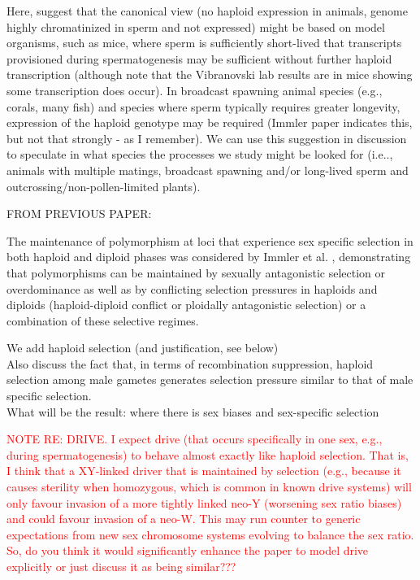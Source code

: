 \documentclass[12pt]{article}
\begin{document}
Here, suggest that the canonical view (no haploid expression in animals, genome highly chromatinized in sperm and not expressed) might be based on model organisms, such as mice, where sperm is sufficiently short-lived that transcripts provisioned during spermatogenesis may be sufficient without further haploid transcription (although note that the Vibranovski lab results are in mice showing some transcription does occur). 
In broadcast spawning animal species (e.g., corals, many fish) and species where sperm typically requires greater longevity, expression of the haploid genotype may be required (Immler paper indicates this, but not that strongly - as I remember). 
We can use this suggestion in discussion to speculate in what species the processes we study might be looked for (i.e.., animals with multiple matings, broadcast spawning and/or long-lived sperm and outcrossing/non-pollen-limited plants). 

{\color{blue} 
\noindent FROM PREVIOUS PAPER:

The maintenance of polymorphism at loci that experience sex specific selection in both haploid and diploid phases was considered by Immler et al. \cite{Immler:2012tl}, demonstrating that polymorphisms can be maintained by sexually antagonistic selection or overdominance as well as by conflicting selection pressures in haploids and diploids (haploid-diploid conflict or ploidally antagonistic selection) or a combination of these selective regimes.  

}

We add haploid selection (and justification, see below)
\\
Also discuss the fact that, in terms of recombination suppression, haploid selection among male gametes generates selection pressure similar to that of male specific selection. 
\\
What will be the result: where there is sex biases and sex-specific selection




\textcolor{red}{NOTE RE: DRIVE. I expect drive (that occurs specifically in one sex, e.g., during spermatogenesis) to behave almost exactly like haploid selection. That is, I think that a XY-linked driver that is maintained by selection (e.g., because it causes sterility when homozygous, which is common in known drive systems) will only favour invasion of a more tightly linked neo-Y (worsening sex ratio biases) and could favour invasion of a neo-W. This may run counter to generic expectations from new sex chromosome systems evolving to balance the sex ratio. So, do you think it would significantly enhance the paper to model drive explicitly or just discuss it as being similar???}
\end{document}

